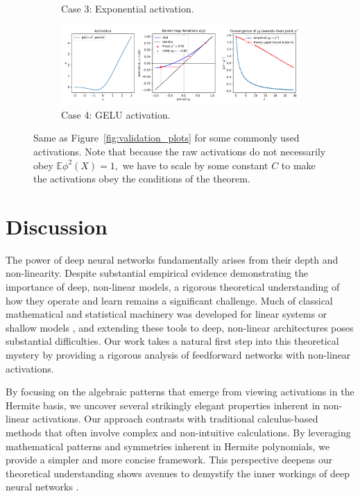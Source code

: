 \documentclass[twoside]{article}
\newcommand{\E}{\mathbb{E}}
\theoremstyle{definition}
\begin{document}
\begin{figure}[ht!]
\begin{subfigure}[b]{0.7\textwidth}
        \caption{\small Case 3: Exponential activation.} 
    \end{subfigure}
    \hfill
    \begin{subfigure}[b]{0.7\textwidth}
        \centering
        \includegraphics[width=\textwidth]{./kernel_map_convergence_case_3_gelu.pdf}
        \caption{\small Case 4: GELU activation.}
    \end{subfigure}
    \caption{\small Same as Figure~\ref{fig:validation_plots} for some commonly used activations. Note that because the raw activations do not necessarily obey $\E \phi^2(X)=1,$ we have to scale by some constant $C$ to make the activations obey the conditions of the theorem.}
    \label{fig:validation_plots_real_activations}
\end{figure}


\section{Discussion}



The power of deep neural networks fundamentally arises from their depth and non-linearity. Despite substantial empirical evidence demonstrating the importance of deep, non-linear models, a rigorous theoretical understanding of how they operate and learn remains a significant challenge. Much of classical mathematical and statistical machinery was developed for linear systems or shallow models \citep{hastie2009elements}, and extending these tools to deep, non-linear architectures poses substantial difficulties. Our work takes a natural first step into this theoretical mystery by providing a rigorous analysis of feedforward networks with non-linear activations. 

By focusing on the algebraic patterns that emerge from viewing activations in the Hermite basis, we uncover several strikingly elegant properties inherent in non-linear activations. Our approach contrasts with traditional calculus-based methods that often involve complex and non-intuitive calculations. By leveraging mathematical patterns and symmetries inherent in Hermite polynomials, we provide a simpler and more concise framework. This perspective deepens our theoretical understanding shows avenues to demystify the inner workings of deep neural networks \citep{goodfellow2016deep, lecun2015deep}.
\end{document}
